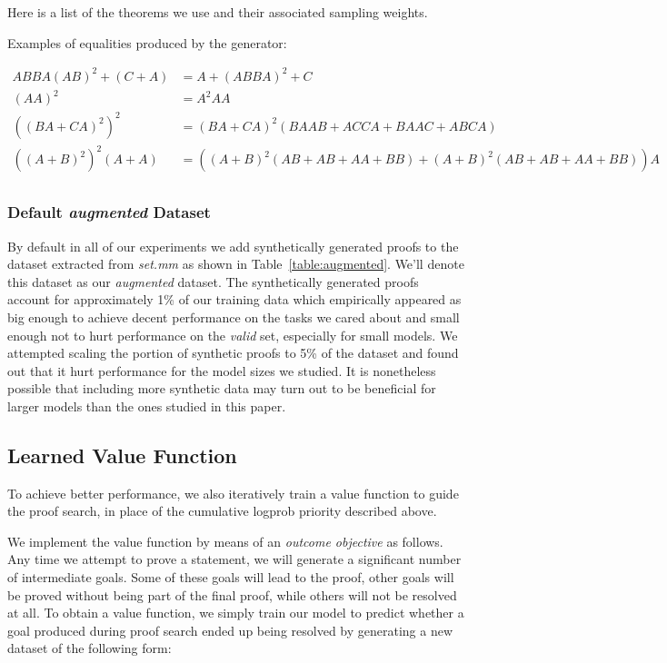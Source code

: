 Here is a list of the theorems we use and their associated sampling weights.

Examples of equalities produced by the generator:

\begin{align*}
ABBA(AB)^2+(C+A) &= A+(ABBA)^2+C \\
(AA)^2 &= A^2AA \\
((BA+CA)^2)^2 &= (BA+CA)^2(BAAB+ACCA+BAAC+ABCA)\\
((A+B)^2)^2(A+A) &= ((A+B)^2(AB+AB+AA+BB)+ (A+B)^2(AB+AB+AA+BB))A \\
\end{align*}

\subsubsection{Default \textit{augmented} Dataset} 

By default in all of our experiments we add synthetically generated proofs to the dataset extracted from \textit{set.mm} as shown in Table~\ref{table:augmented}. We'll denote this dataset as our \textit{augmented} dataset. The synthetically generated proofs account for approximately 1\% of our training data which empirically appeared as big enough to achieve decent performance on the tasks we cared about and small enough not to hurt performance on the \textit{valid} set, especially for small models. We attempted scaling the portion of synthetic proofs to 5\% of the dataset and found out that it hurt performance for the model sizes we studied. It is nonetheless possible that including more synthetic data may turn out to be beneficial for larger models than the ones studied in this paper.

\subsection{Learned Value Function}
\label{section:learnedvalue}

To achieve better performance, we also iteratively train a value function to guide the proof search, in place of the cumulative logprob priority described above.

We implement the value function by means of an \textit{outcome objective} as follows. Any time we attempt to prove a statement, we will generate a significant number of intermediate goals. Some of these goals will lead to the proof, other goals will be proved without being part of the final proof, while others will not be resolved at all. To obtain a value function, we simply train our model to predict whether a goal produced during proof search ended up being resolved by generating a new dataset of the following form:


